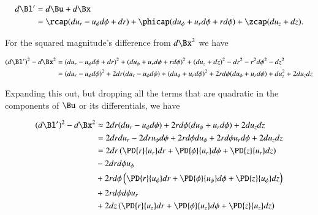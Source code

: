 \begin{align*}
d\Bl' 
&= d\Bu + d\Bx 
\\
&= \rcap( du_r - u_\phi d\phi + dr )
+ \phicap ( du_\phi + u_r d\phi + r d\phi )
+ \zcap ( du_z + dz ).
\end{align*}

For the squared magnitude's difference from $d\Bx^2$ we have

\begin{align*}
(d\Bl')^2 - d\Bx^2
&= 
( du_r - u_\phi d\phi + dr )^2
+ ( du_\phi + u_r d\phi + r d\phi )^2
+ ( du_z + dz )^2
-dr^2 - r^2 d\phi^2 - dz^2 \\
&=
( du_r - u_\phi d\phi )^2 
+ 2 dr ( du_r - u_\phi d\phi )
+ ( du_\phi + u_r d\phi )^2
+ 2 r d\phi ( du_\phi + u_r d\phi )
+ du_z^2 + 2 du_z dz \\
\end{align*}

Expanding this out, but dropping all the terms that are quadratic in the components of $\Bu$ or its differentials, we have

\begin{align*}
(d\Bl')^2 - d\Bx^2
&\approx
  2 dr ( du_r - u_\phi d\phi )
+ 2 r d\phi ( du_\phi + u_r d\phi )
+ 2 du_z dz \\
&=
  2 dr du_r 
- 2 dr u_\phi d\phi 
+ 2 r d\phi du_\phi 
+ 2 r d\phi u_r d\phi 
+ 2 du_z dz 
\\
&=
  2 dr 
\left( 
\PD{r}{u_r} dr
+\PD{\phi}{u_r} d\phi
+\PD{z}{u_r} dz
\right) \\
&- 2 dr d\phi u_\phi  \\
&+ 2 r d\phi 
\left( 
\PD{r}{u_\phi} dr
+\PD{\phi}{u_\phi} d\phi
+\PD{z}{u_\phi} dz
\right) \\
&+ 2 r d\phi d\phi u_r \\
&+ 2 
dz 
\left( 
\PD{r}{u_z} dr
+\PD{\phi}{u_z} d\phi
+\PD{z}{u_z} dz
\right) \\
\end{align*}

\EndArticle
